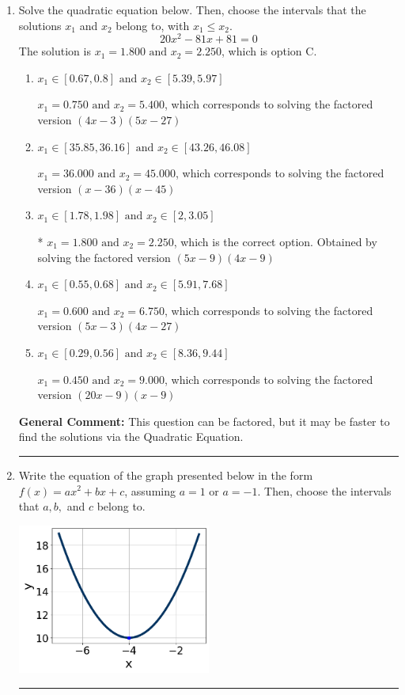 \documentclass{extbook}[14pt]
\newcommand{\litem}[1]{\item #1

\rule{\textwidth}{0.4pt}}
\begin{document}
\begin{enumerate}\litem{
Solve the quadratic equation below. Then, choose the intervals that the solutions $x_1$ and $x_2$ belong to, with $x_1 \leq x_2$.
\[ 20x^{2} -81 x + 81 = 0 \]The solution is \( x_1 = 1.800 \text{ and } x_2 = 2.250 \), which is option C.\begin{enumerate}[label=\Alph*.]
\item \( x_1 \in [0.67, 0.8] \text{ and } x_2 \in [5.39, 5.97] \)

$x_1 = 0.750 \text{ and } x_2 = 5.400$, which corresponds to solving the factored version $(4x -3)(5x -27)$
\item \( x_1 \in [35.85, 36.16] \text{ and } x_2 \in [43.26, 46.08] \)

$x_1 = 36.000 \text{ and } x_2 = 45.000$, which corresponds to solving the factored version $(x -36)(x -45)$
\item \( x_1 \in [1.78, 1.98] \text{ and } x_2 \in [2, 3.05] \)

* $x_1 = 1.800 \text{ and } x_2 = 2.250$, which is the correct option. Obtained by solving the factored version $(5x -9)(4x -9)$
\item \( x_1 \in [0.55, 0.68] \text{ and } x_2 \in [5.91, 7.68] \)

$x_1 = 0.600 \text{ and } x_2 = 6.750$, which corresponds to solving the factored version $(5x -3)(4x -27)$
\item \( x_1 \in [0.29, 0.56] \text{ and } x_2 \in [8.36, 9.44] \)

$x_1 = 0.450 \text{ and } x_2 = 9.000$, which corresponds to solving the factored version $(20x -9)(x -9)$
\end{enumerate}

\textbf{General Comment:} This question can be factored, but it may be faster to find the solutions via the Quadratic Equation.
}
\litem{
Write the equation of the graph presented below in the form $f(x)=ax^2+bx+c$, assuming  $a=1$ or $a=-1$. Then, choose the intervals that $a, b,$ and $c$ belong to.

\begin{center}
    \includegraphics[width=0.5\textwidth]{../Figures/quadraticGraphToEquationA.png}
\end{center}


}
\end{enumerate}
\end{document}

